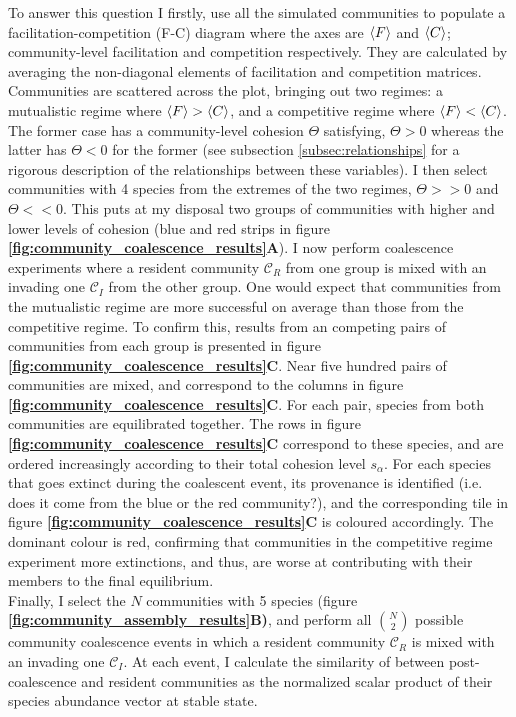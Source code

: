 \documentclass[titlepage,11pt]{article}
\begin{document}
\begin{linenumbers}
\begin{singlespace}
			To answer this question I firstly, use all the simulated communities to populate a facilitation-competition (F-C) diagram where the axes are  $ \braket{F} $ and $ \braket{C}$; community-level facilitation and competition respectively. They are calculated by averaging the non-diagonal elements of facilitation and competition matrices. Communities are scattered across the plot, bringing out two regimes: a mutualistic regime where $  \braket{F} > \braket{C} $, and a competitive regime where $ \braket{F} < \braket{C} $. The former case has a community-level cohesion $ \Theta $ satisfying, $  \Theta > 0$ whereas the latter has $ \Theta < 0 $ for the former (see subsection \ref{subsec:relationships} for a rigorous description of the relationships between these variables). I then select communities with 4 species from the extremes of the two regimes, $ \Theta >> 0 $ and $ \Theta << 0 $. This puts at my disposal two groups of communities with higher and lower levels of cohesion (blue and red strips in figure \textbf{\ref{fig:community_coalescence_results}A}). I now perform coalescence experiments where a resident community $\mathcal{C}_R$  from one group is mixed with an invading one $ \mathcal{C}_I $ from the other group. One would expect that communities from the mutualistic regime are more successful on average than those from the competitive regime. To confirm this, results from an  competing pairs of communities from each group is presented in figure \textbf{\ref{fig:community_coalescence_results}C}. Near five hundred pairs of communities are mixed, and correspond to the columns in figure  \textbf{\ref{fig:community_coalescence_results}C}. For each pair, species from both communities are equilibrated together. The rows in figure \textbf{\ref{fig:community_coalescence_results}C} correspond to these species, and are ordered increasingly according to their total cohesion level $ s_{\alpha} $. For each species that goes extinct during the coalescent event, its provenance is identified (i.e. does it come from the blue or the red community?), and the corresponding tile in figure \textbf{\ref{fig:community_coalescence_results}C} is coloured accordingly. The dominant colour is red, confirming that communities in the competitive regime experiment more extinctions, and thus, are worse at contributing with their members to the final equilibrium.\\
			Finally, I select the $ N $ communities with 5 species (figure \textbf{\ref{fig:community_assembly_results}B)}, and perform  all $ {N}\choose{2} $ possible community coalescence events in which a resident community $\mathcal{C}_R$ is mixed with an invading one $ \mathcal{C}_I $. At each event, I calculate the similarity of between post-coalescence and resident communities as the normalized scalar product of their species abundance vector at stable state.

\end{singlespace}
\end{linenumbers}
\end{document}
